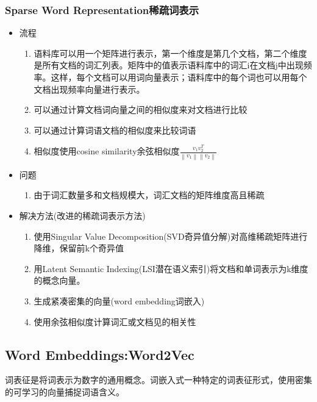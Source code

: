 \documentclass[UTF8]{ctexart}
\begin{document}
\subsubsection{Sparse Word Representation稀疏词表示}
\begin{itemize}
    \item 流程
    \begin{enumerate}
        \item 语料库可以用一个矩阵进行表示，第一个维度是第几个文档，第二个维度是所有文档的词汇列表。矩阵中的值表示语料库中的词汇i在文档j中出现频率。这样，每个文档可以用词向量表示；语料库中的每个词也可以用每个文档出现频率向量进行表示。
        \item 可以通过计算文档词向量之间的相似度来对文档进行比较
        \item 可以通过计算词语文档的相似度来比较词语
        \item 相似度使用cosine similarity余弦相似度$\frac{v_{1}v_{2}^{T}}{\left\lVert v_{1}\right\rVert \left\lVert v_{2}\right\rVert}$ 
    \end{enumerate}
    \item 问题
    \begin{enumerate}
        \item 由于词汇数量多和文档规模大，词汇文档的矩阵维度高且稀疏
    \end{enumerate}

    \item 解决方法(改进的稀疏词表示方法)
    \begin{enumerate}
        \item 使用Singular Value Decomposition(SVD奇异值分解)对高维稀疏矩阵进行降维，保留前k个奇异值
        \item 用Latent Semantic Indexing(LSI潜在语义索引)将文档和单词表示为k维度的概念向量。
        \item 生成紧凑密集的向量(word embedding词嵌入)
        \item 使用余弦相似度计算词汇或文档见的相关性
    \end{enumerate}
\end{itemize}

\subsection{Word Embeddings:Word2Vec}

词表征是将词表示为数字的通用概念。词嵌入式一种特定的词表征形式，使用密集的可学习的向量捕捉词语含义。
\end{document}
